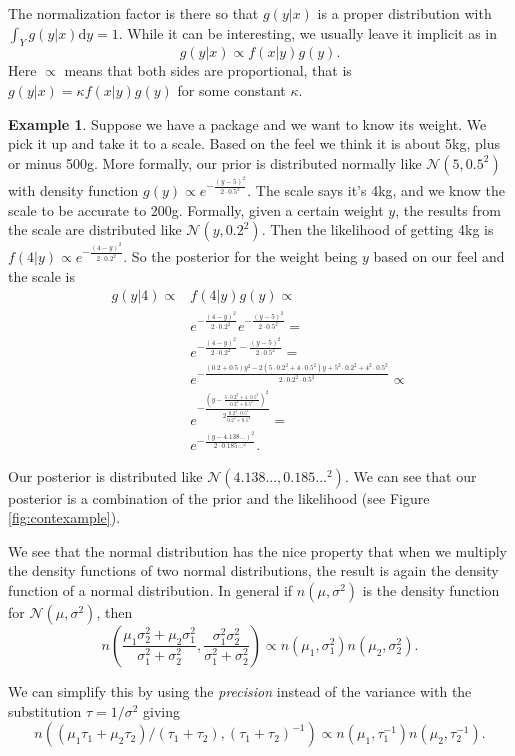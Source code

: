\documentclass[12pt,vu]{adammath}
\newcommand\ddfrac[2]{\frac{\displaystyle #1}{\displaystyle #2}}
\theoremstyle{plain}
\theoremstyle{definition}
\newtheorem{example}[theorem]{Example}
\theoremstyle{remark}
\begin{document}
The normalization factor is there so that $g(y|x)$ is a proper distribution with $\int_Y g(y|x) \mathrm{d}y = 1$.
While it can be interesting, we usually leave it implicit as in
$$g(y|x) \propto f(x | y) g(y).$$
Here $\propto$ means that both sides are proportional, that is $g(y|x) = \kappa f(x | y) g(y)$ for some constant $\kappa$.

\begin{mybox}
\begin{example}\label{contexample}
Suppose we have a package and we want to know its weight.
We pick it up and take it to a scale.
Based on the feel we think it is about 5kg, plus or minus 500g.
More formally, our prior is distributed normally like $\mathcal{N}(5, 0.5^2)$ with density function $g(y) \propto e^{-\ddfrac{(y - 5)^2}{2 \cdot 0.5^2}}$.
The scale says it's 4kg, and we know the scale to be accurate to 200g.
Formally, given a certain weight $y$, the results from the scale are distributed like $\mathcal{N}(y, 0.2^2)$.
Then the likelihood of getting 4kg is $f(4 | y) \propto e^{-\ddfrac{(4 - y)^2}{2 \cdot 0.2^2}}$.
So the posterior for the weight being $y$ based on our feel and the scale is
\begin{align*}
  g(y | 4) \propto &f(4 | y) g(y) \propto \\
&e^{-\ddfrac{(4 - y)^2}{2 \cdot 0.2^2}} e^{-\ddfrac{(y - 5)^2}{2 \cdot 0.5^2}} = \\
&e^{-\ddfrac{(4 - y)^2}{2 \cdot 0.2^2} - \ddfrac{(y - 5)^2}{2 \cdot 0.5^2}} = \\
& e^{-\ddfrac{(0.2 + 0.5)y^2 - 2(5 \cdot 0.2^2 + 4 \cdot 0.5^2)y + 5^2 \cdot 0.2^2 + 4^2 \cdot 0.5^2}{2 \cdot 0.2^2 \cdot 0.5^2}} \propto \\
& e^{-\ddfrac{\left(y - \ddfrac{5 \cdot 0.2^2 + 4 \cdot 0.5^2}{0.2^2 + 0.5^2}\right)^2}{2\ddfrac{0.2^2 \cdot 0.5^2}{0.2^2 + 0.5^2}}} = \\
& e^{-\ddfrac{(y - 4.138...)^2}{2 \cdot 0.185...^2}}.
\end{align*}

Our posterior is distributed like $\mathcal{N}(4.138..., 0.185...^2)$.
We can see that our posterior is a combination of the prior and the likelihood (see Figure \ref{fig:contexample}).

We see that the normal distribution has the nice property that when we multiply the density functions of two normal distributions, the result is again the density function of a normal distribution.
In general if $n(\mu, \sigma^2)$ is the density function for $\mathcal{N}(\mu, \sigma^2)$, then
$$n\left(\ddfrac{\mu_1\sigma_2^2 + \mu_2\sigma_1^2}{\sigma_1^2 + \sigma_2^2}, \ddfrac{\sigma_1^2 \sigma_2^2}{\sigma_1^2 + \sigma_2^2}\right) \propto
n\left(\mu_1, \sigma_1^2\right) n\left(\mu_2, \sigma_2^2\right).$$

We can simplify this by using the \emph{precision} instead of the variance with the substitution $\tau = 1 / \sigma^2$ giving
$$n\left((\mu_1 \tau_1 + \mu_2 \tau_2)/(\tau_1 + \tau_2), (\tau_1 + \tau_2)^{-1} \right) \propto
n\left(\mu_1, \tau_1^{-1}\right) n\left(\mu_2, \tau_2^{-1}\right).$$

\end{example}
\end{mybox}
\end{document}
